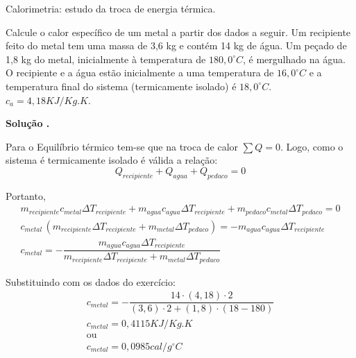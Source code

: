 \documentclass[a4paper, 12pt]{article}
\newenvironment{question}[2][Questão]{\begin{trivlist}
\item[\hskip \labelsep {\bfseries #1}\hskip \labelsep {\bfseries #2.}]}{\end{trivlist}}
\newenvironment{solving}[1][\unskip]{%
\vspace{0.2cm}

\noindent\textbf{ Solução #1.}
\vspace{0.1cm}

}
{}
\begin{document}
\newcommand{\thedepartment}{Faculdade de Engenharia Elétrica}
\newcommand{\thecourse}{FEELT}
\newcommand{\thetitle}{Temperatura, calor e primeira lei da termodinâmica}
\newcommand{\thetype}{Trabalho Extra da Disciplina de Física III}
\newcommand{\theproftitle}{Bacharel em Física}
\newcommand{\thestudent}{Lesly Viviane Montúfar Berrios\\
\centering11811ETE001}
\newcommand{\theadvisor}{Prof. Silésia Curcino}
\newcommand{\thecity}{Uberlândia}

\thispagestyle{empty} 

\begin{question}{1}  Calorimetria: estudo da troca de energia térmica.

Calcule o calor específico de um metal a partir dos dados a seguir. Um recipiente feito do metal tem uma massa de 3,6 kg e contém 14 kg de água. Um peçado de 1,8 kg do metal, inicialmente à temperatura de $180,0^{\circ}C$, é mergulhado na água. O recipiente e a água estão inicialmente a uma temperatura de  $16,0^{\circ}C$ e a temperatura final do sistema (termicamente isolado) é  $18,0^{\circ}C$. $c_a=4,18KJ/Kg.K$.

\end{question}

\begin{solving}
Para o Equilíbrio térmico tem-se que na troca de calor $\sum Q = 0$. Logo, como o sistema é termicamente isolado é válida a relação:
$$Q_{recipiente} + Q_{agua}+Q_{pedaco}=0$$

Portanto, 
\begin{gather*}
m_{recipiente} c_{metal}\Delta T_{recipiente} + m_{agua} c_{agua}\Delta T_{recipiente} + m_{pedaco} c_{metal}\Delta T_{pedaco} = 0\\
 c_{metal}\, (m_{recipiente}\Delta T_{recipiente}+ m_{metal} \Delta T_{pedaco}) = -m_{agua} c_{agua}\Delta T_{recipiente}\\
 c_{metal} = -\dfrac{m_{agua} c_{agua}\Delta T_{recipiente}}{m_{recipiente}\Delta T_{recipiente}+ m_{metal} \Delta T_{pedaco}}
\end{gather*}

Substituindo com os dados do exercício:
\begin{gather*}
c_{metal} = -\dfrac{14\cdot (4,18)\cdot 2}{(3,6)\cdot 2+ (1,8)\cdot (18-180)}\\
c_{metal} = 0,4115KJ/Kg.K\\
\text{ou}\\
c_{metal} = 0,0985cal/g^{\circ}C
\end{gather*}

\end{solving}
\end{document}
